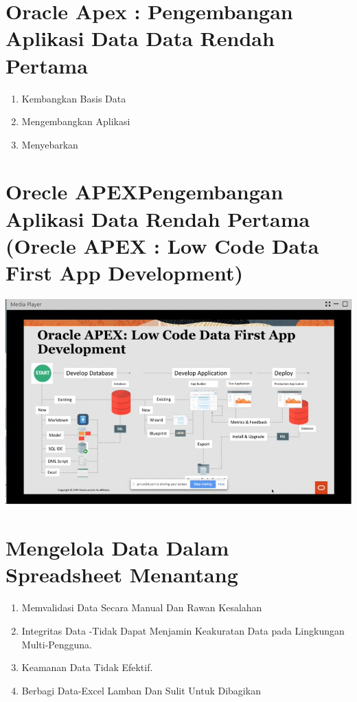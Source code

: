 \documentclass{article}
\begin{document}
\section{Oracle Apex : Pengembangan Aplikasi Data Data Rendah Pertama}
\begin{enumerate}

    \item Kembangkan Basis Data
    \item Mengembangkan Aplikasi
    \item Menyebarkan
    
\end{enumerate}
\section{Orecle APEXPengembangan Aplikasi Data Rendah Pertama
(Orecle APEX : Low Code Data First App Development)}

\begin{center}
    \includegraphics[width=10cm\textwidth]{figure/low data.jpg}
    \end{center}
\section{Mengelola Data Dalam Spreadsheet Menantang}
\begin{enumerate}
    \item Memvalidasi Data Secara Manual Dan Rawan Kesalahan
\item Integritas Data -Tidak Dapat Menjamin Keakuratan Data pada Lingkungan Multi-Pengguna.
\item Keamanan Data Tidak Efektif.
\item Berbagi Data-Excel Lamban Dan Sulit Untuk Dibagikan
\end{enumerate}
\end{document}
